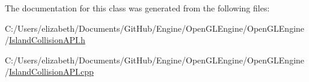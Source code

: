 The documentation for this class was generated from the following files\+:\begin{DoxyCompactItemize}
\item 
C\+:/\+Users/elizabeth/\+Documents/\+Git\+Hub/\+Engine/\+Open\+G\+L\+Engine/\+Open\+G\+L\+Engine/\hyperlink{_island_collision_a_p_i_8h}{Island\+Collision\+A\+P\+I.\+h}\item 
C\+:/\+Users/elizabeth/\+Documents/\+Git\+Hub/\+Engine/\+Open\+G\+L\+Engine/\+Open\+G\+L\+Engine/\hyperlink{_island_collision_a_p_i_8cpp}{Island\+Collision\+A\+P\+I.\+cpp}\end{DoxyCompactItemize}
